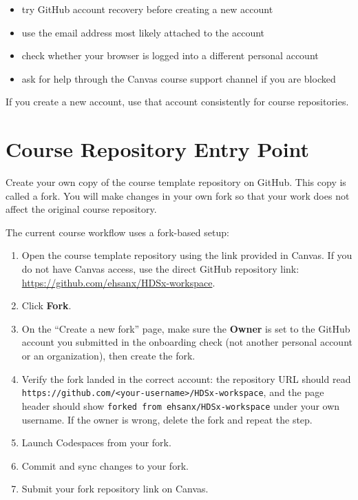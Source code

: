 \documentclass[
  letterpaper,
  DIV=11,
  numbers=noendperiod,
  oneside]{scrreprt}
\providecommand{\tightlist}{%
  \setlength{\itemsep}{0pt}\setlength{\parskip}{0pt}}
\begin{document}
\begin{itemize}
\tightlist
\item
  try GitHub account recovery before creating a new account
\item
  use the email address most likely attached to the account
\item
  check whether your browser is logged into a different personal account
\item
  ask for help through the Canvas course support channel if you are
  blocked
\end{itemize}

If you create a new account, use that account consistently for course
repositories.

\section*{Course Repository Entry
Point}\label{course-repository-entry-point}


Create your own copy of the course template repository on GitHub. This
copy is called a fork. You will make changes in your own fork so that
your work does not affect the original course repository.

The current course workflow uses a fork-based setup:

\begin{enumerate}
\def\labelenumi{\arabic{enumi}.}
\tightlist
\item
  Open the course template repository using the link provided in Canvas.
  If you do not have Canvas access, use the direct GitHub repository
  link: \url{https://github.com/ehsanx/HDSx-workspace}.
\item
  Click \textbf{Fork}.
\item
  On the ``Create a new fork'' page, make sure the \textbf{Owner} is set
  to the GitHub account you submitted in the onboarding check (not
  another personal account or an organization), then create the fork.
\item
  Verify the fork landed in the correct account: the repository URL
  should read
  \texttt{https://github.com/\textless{}your-username\textgreater{}/HDSx-workspace},
  and the page header should show
  \texttt{forked\ from\ ehsanx/HDSx-workspace} under your own username.
  If the owner is wrong, delete the fork and repeat the step.
\item
  Launch Codespaces from your fork.
\item
  Commit and sync changes to your fork.
\item
  Submit your fork repository link on Canvas.
\end{enumerate}
\end{document}
